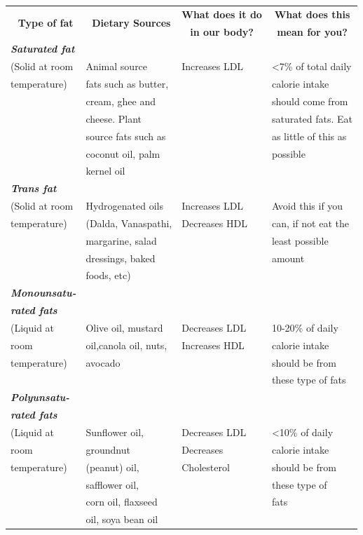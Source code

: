{
\addtolength{\tabcolsep}{-6pt}
\begin{longtable}{|l|l|l|l|}
\hline
\multicolumn{1}{|c|}{\multirow{2}{2.3cm}{\textbf{\,\,\,Type of fat}}} & \multicolumn{1}{c|}{\multirow{2}{3.1cm}{\textbf{\,\,\,Dietary Sources}}} & \textbf{What does it do} & \multicolumn{1}{c|}{\textbf{What does this}}\\
 &  & \multicolumn{1}{c}{\textbf{in our body?}} & \multicolumn{1}{|c|}{\textbf{mean for you?}}\\
\hline
\textbf{\textit{Saturated fat\index{Saturated fat}}} &  &  & \\
(Solid at room & Animal source & Increases LDL & \textless 7\% of total daily\\
temperature) & fats such as butter, &  & calorie intake\\
 & cream, ghee and &  & should come from\\
 & cheese. Plant &  & saturated fats. Eat\\
 & source fats such as &  & as little of this as\\
 & coconut oil, palm &  & possible\\
 & kernel oil &  & \\
\hline
\textbf{\textit{Trans fat\index{Transfat}}} &  &  & \\
(Solid at room & Hydrogenated oils & Increases LDL & Avoid this if you\\
temperature) & (Dalda, Vanaspathi, & Decreases HDL & can, if not eat the\\
 & margarine, salad &  & least possible\\
 & dressings, baked &  & amount\\
 & foods, etc) &  & \\
\hline
\textbf{\textit{Monounsatu-}} &  &  & \\
\textbf{\textit{rated fats\index{Monounsaturated fats}}} &  &  & \\
(Liquid at & Olive oil, mustard & Decreases LDL & 10-20\% of daily\\
room & oil,canola oil, nuts, & Increases HDL & calorie intake\\
temperature) & avocado &  & should be from\\
 &  &  & these type of fats\\
\hline
\textbf{\textit{Polyunsatu-}} &  &  & \\
\textbf{\textit{rated fats}} &  &  & \\
(Liquid at & Sunflower oil, & Decreases LDL & \textless 10\% of daily\\
room & groundnut & Decreases & calorie intake\\
temperature) & (peanut) oil, & Cholesterol & should be from\\
 & safflower oil, &  & these type of\\
 & corn oil, flaxseed &  & fats\\
 & oil, soya bean oil &  & \\
\hline
\end{longtable}
}\relax

